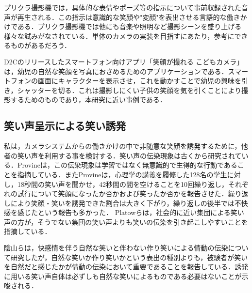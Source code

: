 \documentclass[report,10pt,uplatex,titlepage]{jsarticle}
\begin{document}
プリクラ撮影機では，具体的な表情やポーズ等の指示について事前収録された音声が再生される．この指示は意識的な笑顔や"変顔"を表出させる言語的な働きかけである．プリクラ撮影機では他にも音楽や照明など撮影シーンを盛り上げる様々な試みがなされている．単体のカメラの実装を目指すにあたり，参考にできるものがあるだろう．

D2Cのリリースしたスマートフォン向けアプリ「笑顔が撮れる こどもカメラ」は，幼児の自然な笑顔を写真におさめるためのアプリケーションである\cite{kodomocamera}．スマートフォンの画面にキャラクターを表示させ，これを動かすことで幼児の興味を引き，シャッターを切る．これは撮影しにくい子供の笑顔を気を引くことにより撮影するためのものであり，本研究に近い事例である．



\subsection{笑い声呈示による笑い誘発}

私は，カメラシステムからの働きかけの中で非随意な笑顔を誘発するために，他者の笑い声を利用する事を検討する．笑い声の伝染現象は古くから研究されている．Provineは，この伝染現象は学習ではなく無意識的で生得的な行動であることを指摘している\cite{provine1996laughter}．またProvineは，心理学の講義を履修した128名の学生に対し，18秒間の笑い声を聞かせ，42秒間の間を空けることを10回繰り返し，それぞれの試行について笑顔になったか否かおよび笑ったか否かを報告させた\cite{provine1992contagious}．繰り返しにより笑顔・笑いを誘発できた割合は大きく下がり，繰り返しの後半では不快感を感じたという報告も多かった． Platowらは，社会的に近い集団による笑い声の方が，そうでない集団の笑い声よりも笑いの伝染を引き起こしやすいことを指摘している\cite{platow41n}．

陰山らは，快感情を伴う自然な笑いと伴わない作り笑いによる情動の伝染について研究したが，自然な笑いか作り笑いかという表出の種別よりも，被験者が笑いを自然だと感じたかが情動の伝染において重要であることを報告している\cite{蔭山2005}．誘発に用いる笑い声自体は必ずしも自然な笑いによるものである必要はないことが示唆される．
\end{document}
